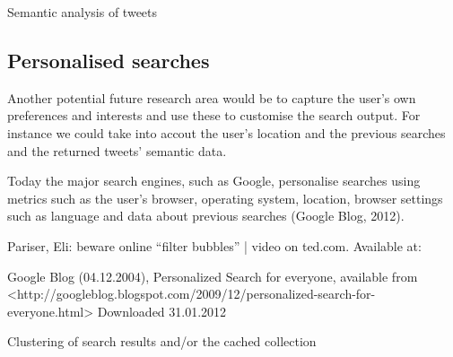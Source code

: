 Semantic analysis of tweets

\subsection{Personalised searches}
Another potential future research area would be to capture the user's own preferences and interests and use these to customise the search output. For instance we could take into accout the user's location and the previous searches and the returned tweets' semantic data.

Today the major search engines, such as Google, personalise searches using metrics such as the user's browser, operating system, location, browser settings such as language and data about previous searches (Google Blog, 2012).

Pariser, Eli: beware online “filter bubbles” | video on ted.com. Available at: %

Google Blog (04.12.2004), Personalized Search for everyone, available from <http://googleblog.blogspot.com/2009/12/personalized-search-for-everyone.html> Downloaded 31.01.2012

Clustering of search results and/or the cached collection